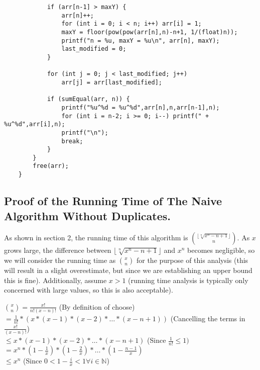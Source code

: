 \documentclass{article}
\begin{document}
\begin{flushleft}
\begin{lstlisting}
            if (arr[n-1] > maxY) {
                arr[n]++;
                for (int i = 0; i < n; i++) arr[i] = 1;
                maxY = floor(pow(pow(arr[n],n)-n+1, 1/(float)n));
                printf("n = %u, maxY = %u\n", arr[n], maxY);
                last_modified = 0;
            }
    
            for (int j = 0; j < last_modified; j++) 
                arr[j] = arr[last_modified];
    
            if (sumEqual(arr, n)) {
                printf("%u^%d = %u^%d",arr[n],n,arr[n-1],n);
                for (int i = n-2; i >= 0; i--) printf(" + %u^%d",arr[i],n);
                printf("\n");
                break;
            }
        }
        free(arr);
    }
\end{lstlisting}

\subsection{Proof of the Running Time of The Naive Algorithm Without Duplicates.}
As shown in section 2, the running time of this algorithm is ${\lfloor\sqrt[n]{x^n - n + 1}\rfloor \choose n}$. As $x$ grows large, the difference between $\lfloor\sqrt[n]{x^n - n + 1}\rfloor$ and $x^n$ becomes negligible, so we will consider the running time as ${x \choose n}$ for the purpose of this analysis (this will result in a slight overestimate, but since we are establishing an upper bound this is fine). Additionally, assume $x > 1$ (running time analysis is typically only concerned with large values, so this is also acceptable).

\begin{tabbing}
    ${x \choose n} = \frac{x!}{n!(x - n)!}$ (By definition of choose) \\
    \hspace{.19in} $= \frac{1}{n!} * (x * (x - 1) * (x - 2) * \ldots * (x - n + 1))$ (Cancelling the terms in $\frac{x!}{(x - n)!}$) \\
    \hspace{.19in} $\leq x * (x - 1) * (x - 2) * \ldots * (x - n + 1)$ (Since $\frac{1}{n!} \leq 1)$ \\
    \hspace{.19in} $= x^n * (1 - \frac{1}{x}) * (1 - \frac{2}{x}) * \ldots * (1 - \frac{n - 1}{x})$ \\
    \hspace{.19in} $\leq x^n$ (Since $0 < 1 - \frac{i}{x} < 1 \forall i \in \mathbb{N}$)        
\end{tabbing}


\end{flushleft}
\end{document}
